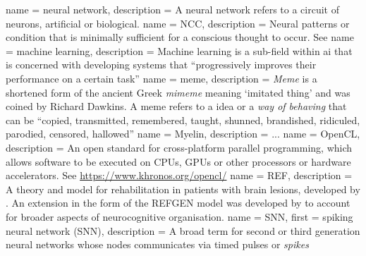  {
  name = {neural network},
  description = {A neural network refers to a circuit of neurons, artificial or biological.}
}
 {
   name = {NCC},
   description = {Neural patterns or condition that is minimally sufficient for a conscious
thought to occur. See \autocite{atkinson2000, Hohwy2009}}
}
 {
  name = machine learning,
  description = {Machine learning is a sub-field within \gls{ai} that is concerned
    with developing systems that ``progressively improves their performance on a
    certain task'' \autocite{wiki:ml}}
}
 {
name = meme,
description = {\textit{Meme} is a shortened form of the ancient Greek \textit{mimeme} meaning
`imitated thing' and was coined by Richard Dawkins. A meme refers to a idea or a
\textit{way of behaving} that can be \enquote{copied, transmitted, remembered, taught, shunned,
brandished, ridiculed, parodied, censored, hallowed} \autocite{dennett2017}}
}
 {
  name = Myelin,
  description = {...}
}
 {
   name = {OpenCL},
   description = {An open standard for cross-platform parallel programming, which
   allows software to be executed on CPUs, GPUs or other processors or hardware accelerators. See \url{
   https://www.khronos.org/opencl/}}
}
 {
  name = REF,
  description = {A theory and model for rehabilitation in patients
  with brain lesions, developed by \cite{Mogensen2011}.
  An extension in the form of the REFGEN model was developed by
  \textcite{Mogensen2017} to account for broader aspects of
  neurocognitive organisation.}
}
 {
  name = SNN,
  first = {spiking neural network (SNN)},
  description = {A broad term for second or third generation neural
                 networks whose nodes communicates via timed pulses or
		 \textit{spikes}}
}
